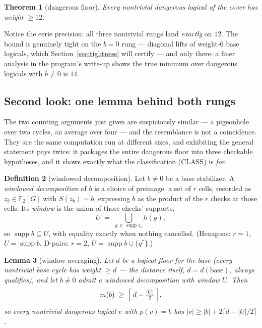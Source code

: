 \documentclass[11pt]{article}
\theoremstyle{plain}
\newtheorem{theorem}{Theorem}[section]
\newtheorem{lemma}[theorem]{Lemma}
\theoremstyle{definition}
\newtheorem{definition}[theorem]{Definition}
\theoremstyle{remark}
\newcommand{\F}{\mathbb{F}}
\newcommand{\suppop}{\operatorname{supp}}
\newcommand{\base}{\mathrm{base}}
\newcommand{\wt}[1]{\lvert #1\rvert}
\begin{document}
\begin{theorem}[dangerous floor]\label{thm:dangerous}
Every nontrivial dangerous logical of the cover has weight $\geq 12$.
\end{theorem}

Notice the eerie precision: all three nontrivial rungs land \emph{exactly} on
$12$. The bound is genuinely tight on the $b = 0$ rung --- diagonal lifts of
weight-6 base logicals, which Section~\ref{sec:tightness} will certify --- and
only there: a finer analysis in the program's write-up shows the true minimum
over dangerous logicals with $b \neq 0$ is $14$.

\subsection{Second look: one lemma behind both rungs}
\label{sec:window}

The two counting arguments just given are suspiciously similar --- a
pigeonhole over two cycles, an average over four --- and the resemblance is
not a coincidence. They are the same computation run at different sizes,
and exhibiting the general statement pays twice: it packages the entire
dangerous floor into three checkable hypotheses, and it shows exactly what
the classification (CLASS) is \emph{for}.

\begin{definition}[windowed decomposition]
Let $b \neq 0$ be a base stabilizer. A \emph{windowed decomposition} of $b$
is a choice of preimage: a set of $r$ cells, recorded as $z_b \in \F_2[G]$
with $S(z_b) = b$, expressing $b$ as the product of the $r$ checks at those
cells. Its \emph{window} is the union of those checks' supports,
\[
U \;=\; \bigcup_{g \,\in\, \suppop z_b} h(g) ,
\]
so $\suppop b \subseteq U$, with equality exactly when nothing cancelled.
(Hexagons: $r = 1$, $U = \suppop b$. D-pairs: $r = 2$, $U = \suppop b \cup
\{q^*\}$.)
\end{definition}

\begin{lemma}[window averaging]\label{lem:window}
Let $d$ be a \emph{logical floor} for the base (every \emph{nontrivial} base
cycle has weight $\geq d$ --- the distance itself, $d = d(\base)$, always
qualifies), and let $b \neq 0$ admit a
windowed decomposition with window $U$. Then
\[
m(b) \;\geq\; \Bigl\lceil\, d - \tfrac{|U|}{2} \,\Bigr\rceil ,
\]
so every nontrivial dangerous logical $v$ with $p(v) = b$ has
$\wt{v} \geq \wt{b} + 2\lceil d - |U|/2 \rceil$.
\end{lemma}
\end{document}
